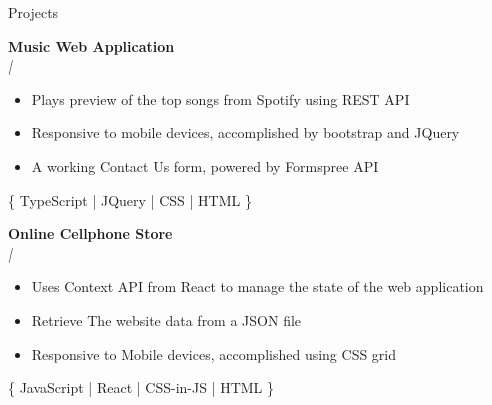 \documentclass{resume} %
\newcommand{\sepspace}{\vspace*{0.5em}}           %
\begin{document}
\begin{rSection}{Projects}

        \textbf{Music Web Application} \\
        \textit{ |  }
        \begin{itemize}[noitemsep,topsep=-6pt]
          \item Plays preview of the top songs from Spotify using REST API
          \item Responsive to mobile devices, accomplished by bootstrap and JQuery
          \item A working Contact Us form, powered by Formspree API
        \end{itemize}
        \{ TypeScript | JQuery | CSS | HTML \} 

        \sepspace

        \textbf{Online Cellphone Store} \\
        \textit{ |  }
        \begin{itemize}[noitemsep,topsep=-6pt]
          \item Uses Context API from React to manage the state of the web application
          \item Retrieve The website data from a JSON file
          \item Responsive to Mobile devices, accomplished using CSS grid
        \end{itemize}
        \{ JavaScript | React | CSS-in-JS | HTML \}

        \sepspace


\end{rSection}
\end{document}
